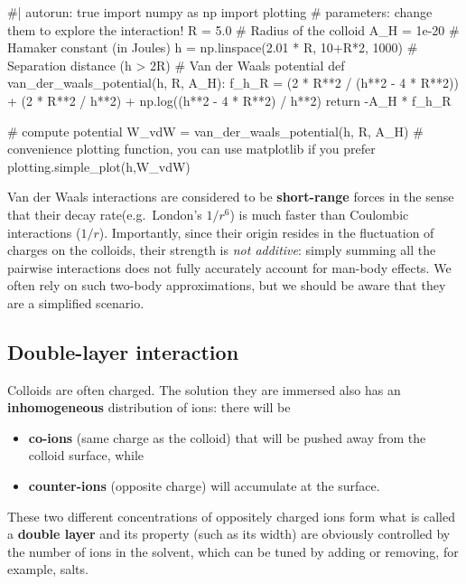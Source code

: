 \documentclass[
  letterpaper,
  enabledeprecatedfontcommands]{report}
\newenvironment{Shaded}{\begin{snugshade}}{\end{snugshade}}
\newcommand{\NormalTok}[1]{\textcolor[rgb]{0.00,0.23,0.31}{#1}}
\begin{document}
\begin{Shaded}
\begin{Highlighting}[]
\NormalTok{\#| autorun: true}
\NormalTok{import numpy as np}
\NormalTok{import plotting}
\NormalTok{\# parameters: change them to explore the interaction!}
\NormalTok{R = 5.0  \# Radius of the colloid}
\NormalTok{A\_H = 1e{-}20  \# Hamaker constant (in Joules)}
\NormalTok{h = np.linspace(2.01 * R, 10+R*2, 1000)  \# Separation distance (h \textgreater{} 2R)}
\NormalTok{\# Van der Waals potential}
\NormalTok{def van\_der\_waals\_potential(h, R, A\_H):}
\NormalTok{    f\_h\_R = (2 * R**2 / (h**2 {-} 4 * R**2)) + (2 * R**2 / h**2) + np.log((h**2 {-} 4 * R**2) / h**2)}
\NormalTok{    return {-}A\_H * f\_h\_R}

\NormalTok{\# compute potential}
\NormalTok{W\_vdW = van\_der\_waals\_potential(h, R, A\_H)}
\NormalTok{\# convenience plotting function, you can use matplotlib if you prefer}
\NormalTok{plotting.simple\_plot(h,W\_vdW)}
\end{Highlighting}
\end{Shaded}

Van der Waals interactions are considered to be \textbf{short-range}
forces in the sense that their decay rate(e.g.~London's \(1/r^6\)) is
much faster than Coulombic interactions (\(1/r\)). Importantly, since
their origin resides in the fluctuation of charges on the colloids,
their strength is \emph{not additive}: simply summing all the pairwise
interactions does not fully accurately account for man-body effects. We
often rely on such two-body approximations, but we should be aware that
they are a simplified scenario.

\subsection{Double-layer interaction}\label{double-layer-interaction}

Colloids are often charged. The solution they are immersed also has an
\textbf{inhomogeneous} distribution of ions: there will be

\begin{itemize}
\item
  \textbf{co-ions} (same charge as the colloid) that will be pushed away
  from the colloid surface, while
\item
  \textbf{counter-ions} (opposite charge) will accumulate at the
  surface.
\end{itemize}

These two different concentrations of oppositely charged ions form what
is called a \textbf{double layer} and its property (such as its width)
are obviously controlled by the number of ions in the solvent, which can
be tuned by adding or removing, for example, salts.
\end{document}
